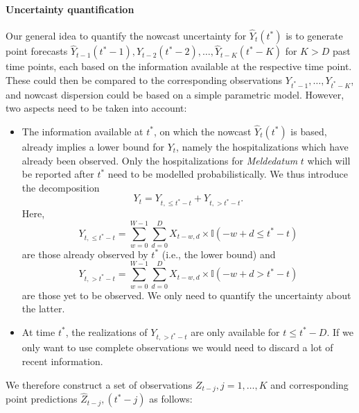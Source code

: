\documentclass[a4paper, 11pt]{article}\usepackage[]{graphicx}\usepackage[]{color}
\begin{document}
\paragraph{Uncertainty quantification} Our general idea to quantify the nowcast uncertainty for $\hat{Y}_t(t^*)$ is to generate point forecasts $\hat{Y}_{t - 1}(t^* - 1), \hat{Y}_{t - 2}(t^* - 2), \dots, \hat{Y}_{t - K}(t^* - K)$ for $K > D$ past time points, each based on the information available at the respective time point. These could then be compared to the corresponding observations $Y_{t^* - 1}, \dots, Y_{t^* - K}$, and nowcast dispersion could be based on a simple parametric model. However, two aspects need to be taken into account:
\begin{itemize}
\item The information available at $t^*$, on which the nowcast $\hat{Y}_{t}(t^*)$ is based, already implies a lower bound for $Y_{t}$, namely the hospitalizations which have already been observed.
Only the hospitalizations for \textit{Meldedatum} $t$ which will be reported after $t^*$ 
need to be modelled probabilistically. We thus introduce the decomposition
$$
Y_{t} = Y_{t, \leq t^* - t} + Y_{t, > t^* - t}.
$$
Here, 
$$
Y_{t, \leq t^* - t} = \sum_{w = 0}^{W - 1}\sum_{d = 0}^D X_{t - w, d} \times \mathbb{I}(- w + d \leq t^* - t)
$$
are those already observed by $t^*$ (i.e., the lower bound) and
$$
Y_{t, > t^* - t} = \sum_{w = 0}^{W - 1}\sum_{d = 0}^D X_{t - w, d} \times \mathbb{I}(- w + d > t^* - t)
$$
are those yet to be observed. We only need to quantify the uncertainty about the latter.
\item At time $t^*$, the realizations of $Y_{t, > t^* - t}$ are only available for $t \leq t^* - D$. If we only want to use complete observations we would need to discard a lot of recent information.
\end{itemize}
We therefore construct a set of observations $Z_{t - j}, j = 1, \dots, K$ and corresponding point predictions $\hat Z_{t - j}, (t^* - j)$ as follows:
\end{document}

